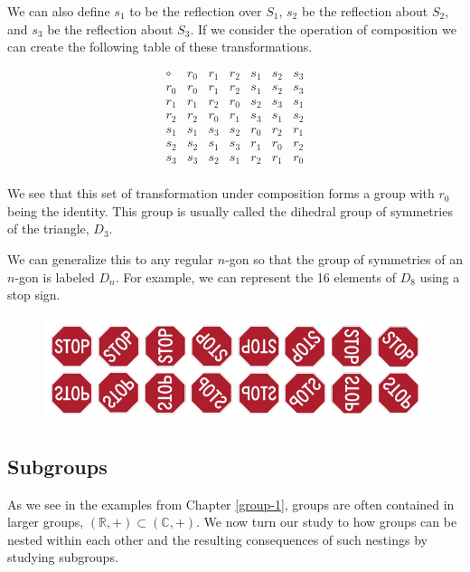 \documentclass[
]{book}
\theoremstyle{definition}
\theoremstyle{definition}
\theoremstyle{definition}
\theoremstyle{definition}
\theoremstyle{remark}
\begin{document}
We can also define \(s_1\) to be the reflection over \(S_1\), \(s_2\) be the reflection about \(S_2\), and \(s_3\) be the reflection about \(S_3\). If we consider the operation of composition we can create the following table of these transformations.

\[\begin{array}{c|cccccc}
\circ & r_0 & r_1 & r_2 & s_1 & s_2 & s_3  \\ \hline
r_0  & r_0 & r_1 & r_2 & s_1 & s_2 & s_3 \\
r_1 & r_1 & r_2 & r_0 & s_2 & s_3 & s_1 \\
r_2 & r_2 & r_0 & r_1 & s_3 & s_1 & s_2 \\
s_1 & s_1 & s_3 & s_2 & r_0 & r_2 & r_1 \\
s_2 & s_2 & s_1 & s_3 & r_1 & r_0 & r_2 \\
s_3 & s_3 & s_2 & s_1 & r_2 & r_1 & r_0 \\
\end{array}\]

We see that this set of transformation under composition forms a group with \(r_0\) being the identity. This group is usually called the dihedral group of symmetries of the triangle, \(D_3\).

We can generalize this to any regular \(n\)-gon so that the group of symmetries of an \(n\)-gon is labeled \(D_n\). For example, we can represent the 16 elements of \(D_8\) using a stop sign.

\begin{figure}

{\centering \includegraphics[width=0.7\linewidth]{images/D8Group} 

}

\end{figure}

\hypertarget{subgroups}{%
\subsection{Subgroups}\label{subgroups}}

As we see in the examples from Chapter \ref{group-1}, groups are often contained in larger groups, \((\mathbb{R},+)\subset (\mathbb{C},+)\). We now turn our study to how groups can be nested within each other and the resulting consequences of such nestings by studying subgroups.
\end{document}

